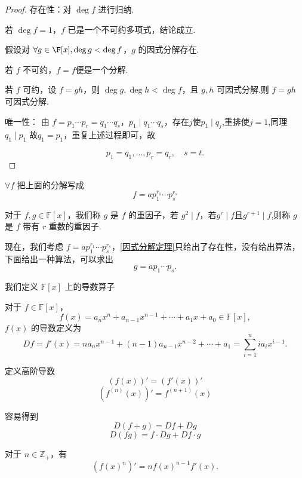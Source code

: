 \begin{proof}
	存在性：对 \( \deg f \) 进行归纳.
	
	若 \( \deg f = 1 \)，\( f \) 已是一个不可约多项式，结论成立.
	
	假设对 \(\forall g\in\F[x] ,\deg g < \deg f \)，\( g \) 的因式分解存在.
	
	若 \( f \) 不可约，\(f=f\)便是一个分解.
	
	若 \( f \) 可约，设 \( f = gh \)，则 \( \deg g, \deg h < \deg f \)，且 \( g, h \) 可因式分解.则 \( f = gh \) 可因式分解.
	
	唯一性： 由 \( f = p_1 \cdots p_r = q_1 \cdots q_s \)，\( p_1 \mid q_1 \cdots q_s \)，存在$j$使$p_1\mid q_j$,重排使\(j=1\),同理\(q_1\mid p_1\) 故\( q_1 = p_1 \)，重复上述过程即可，故
	
	\[ p_1 = q_1, \ldots, p_r = q_r, \quad s = t. \]
	
	
	
\end{proof}
$\forall f$ 把上面的分解写成
\[f=ap_{1}^{r_1}\cdots p_{s}^{r_s}\]
\begin{definition}\label{p1:concept:c1-l916}
	对于 \( f, g \in \mathbb{F}[x] \)，我们称 \( g \) 是 \( f \) 的重因子，若 \( g^2 \mid f \)，若\( g^r \mid f \)且\( g^{r+1} \mid f \),则称 \( g \) 是 \( f \) 带有 \( r \) 重数的重因子.
\end{definition}

现在，我们考虑 \( f = a p_1^{r_1} \cdots p_s^{r_s} \)，\ref{因式分解定理}只给出了存在性，没有给出算法，下面给出一种算法，可以求出
\[ g = a p_1 \cdots p_s. \]



我们定义 \( \mathbb{F}[x] \) 上的导数算子
\begin{definition}\label{p1:concept:c1-l926}
	对于 \( f \in \mathbb{F}[x] \)，
	\[ f(x) = a_n x^n + a_{n-1} x^{n-1} + \cdots + a_1 x + a_0 \in \mathbb{F}[x], \]
	\( f(x) \) 的导数定义为
	\[ Df = f'(x) = n a_n x^{n-1} + (n-1) a_{n-1} x^{n-2} + \cdots + a_1 = \sum_{i=1}^n i a_i x^{i-1}. \]
	
	定义高阶导数\[ (f(x))' = (f'(x))' \]
	\[ (f^{(n)}(x))' = f^{(n+1)}(x) \]
\end{definition}
容易得到
\[ D(f + g) = Df + Dg \]
\[ D(fg) = f \cdot Dg + Df \cdot g \]

对于 \( n \in \mathbb{Z}_+ \)，有
\[ (f(x)^n)' = n f(x)^{n-1} f'(x). \]


